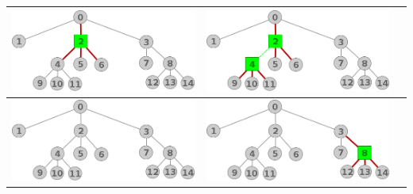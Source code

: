 \begin{center}
\begin{tabular}{ |c||c||c| }
			\includegraphics[scale = 0.3]{img/ej3/constructiva_golosa/tree_st01.png} &
			\includegraphics[scale = 0.3]{img/ej3/constructiva_golosa/tree_st02.png} \\
			\hline
			\includegraphics[scale = 0.3]{img/ej3/constructiva_golosa/tree_st0.png} &
			\includegraphics[scale = 0.3]{img/ej3/constructiva_golosa/tree_st11.png} &

\end{tabular}
\end{center}
